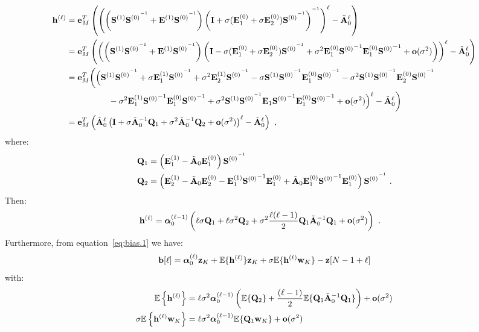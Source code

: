 \begin{align*}
{\mathbf h}^{(\ell)} &= {\mathbf e}_M^T\left( \left( \left({\mathbf S}^{(1)}{{\mathbf S}^{(0)}}^{^{-1}}+{\mathbf E}^{(1)}{{\mathbf S}^{(0)}}^{^{-1}}\right)\left({\mathbf I}+\sigma({\mathbf E}_1^{(0)}+\sigma{\mathbf E}_2^{(0)}){{\mathbf S}^{(0)}}^{^{-1}}\right)^{^{-1}} \right)^\ell- \tilde{{\mathbf A}}_0^\ell\right) \\
& = {\mathbf e}_M^T\left( \left( \left({\mathbf S}^{(1)}{{\mathbf S}^{(0)}}^{^{-1}}+{\mathbf E}^{(1)}{{\mathbf S}^{(0)}}^{^{-1}}\right)\left({\mathbf I}-\sigma({\mathbf E}_1^{(0)}+\sigma{\mathbf E}_2^{(0)}){{\mathbf S}^{(0)}}^{^{-1}} + \sigma^2{\mathbf E}_1^{(0)}{{\mathbf S}^{(0)}}^{-1}{\mathbf E}_1^{(0)}{{\mathbf S}^{(0)}}^{-1} +{\mathbf o}(\sigma^2)\right)\right)^\ell- \tilde{{\mathbf A}}_0^\ell\right) \\
& = {\mathbf e}_M^T\bigg( \Big( {\mathbf S}^{(1)}{{\mathbf S}^{(0)}}^{^{-1}}+\sigma{\mathbf E}^{(1)}_1{{\mathbf S}^{(0)}}^{^{-1}}+\sigma^2{\mathbf E}^{(1)}_2{{\mathbf S}^{(0)}}^{^{-1}} - \sigma {\mathbf S}^{(1)}{{\mathbf S}^{(0)}}^{^{-1}}{\mathbf E}_1^{(0)}{{\mathbf S}^{(0)}}^{^{-1}} - \sigma^2{\mathbf S}^{(1)}{{\mathbf S}^{(0)}}^{^{-1}}{\mathbf E}_2^{(0)}{{\mathbf S}^{(0)}}^{^{-1}}\\
& \hspace{50pt}-\sigma^2{\mathbf E}^{(1)}_1{{\mathbf S}^{(0)}}^{-1}{\mathbf E}_1^{(0)}{{\mathbf S}^{(0)}}^{-1} + \sigma^2{\mathbf S}^{(1)}{{\mathbf S}^{(0)}}^{^{-1}}{\mathbf E}_1{{\mathbf S}^{(0)}}^{-1}{\mathbf E}_1^{(0)}{{\mathbf S}^{(0)}}^{-1} +{\mathbf o}(\sigma^2)\Big)^\ell- \tilde{{\mathbf A}}_0^\ell\bigg) \\
&= {\mathbf e}_M^T\left( \tilde{{\mathbf A}}_0^\ell\left( {\mathbf I}+\sigma\tilde{{\mathbf A}}_0^{-1}{\mathbf Q}_1+\sigma^2\tilde{{\mathbf A}}_0^{-1}{\mathbf Q}_2 +{\mathbf o}(\sigma^2)\right)^\ell- \tilde{{\mathbf A}}_0^\ell\right)\ ,\\
\end{align*}
where:
\begin{align*}
{\mathbf Q}_1 &= \left( {\mathbf E}^{(1)}_1- \tilde{{\mathbf A}}_0{\mathbf E}_1^{(0)} \right){{\mathbf S}^{(0)}}^{^{-1}}\\
{\mathbf Q}_2 &= \left( {\mathbf E}^{(1)}_2 - \tilde{{\mathbf A}}_0{\mathbf E}_2^{(0)} - {\mathbf E}^{(1)}_1{{\mathbf S}^{(0)}}^{-1}{\mathbf E}_1^{(0)} + \tilde{{\mathbf A}}_0{\mathbf E}_1^{(0)}{{\mathbf S}^{(0)}}^{-1}{\mathbf E}_1^{(0)}\right){{\mathbf S}^{(0)}}^{^{-1}} \ .
\end{align*}
Then:
\begin{align*}
{\mathbf h}^{(\ell)} &= \boldsymbol{\alpha}_0^{(\ell-1)}\left(\ell\sigma{\mathbf Q}_1 + \ell\sigma^2{\mathbf Q}_2 + \sigma^2\dfrac{\ell(\ell-1)}{2}{\mathbf Q}_1\tilde{{\mathbf A}}_0^{-1}{\mathbf Q}_1 + {\mathbf o}(\sigma^2)\right)\ .
\end{align*}
Furthermore, from equation~\eqref{eq:bias.1} we have:
\begin{equation*}
{\mathbf b}[\ell] = \boldsymbol{\alpha}_0^{(\ell)}{\mathbf z}_{K} + {\mathbb E}\{{\mathbf h}^{(\ell)}\}{\mathbf z}_{K} + \sigma{\mathbb E}\{{\mathbf h}^{(\ell)}{\mathbf w}_{K}\} - {\mathbf z}[N-1+\ell]
\end{equation*}
with:
\begin{align*}
{\mathbb E}\left\{{\mathbf h}^{(\ell)}\right\} &= \ell\sigma^2\boldsymbol{\alpha}_0^{(\ell-1)}\left({\mathbb E}\{{\mathbf Q}_2\} + \dfrac{(\ell-1)}{2}{\mathbb E}\{{\mathbf Q}_1\tilde{{\mathbf A}}_0^{-1}{\mathbf Q}_1\}\right)  + {\mathbf o}(\sigma^2)\\
\sigma{\mathbb E}\left\{{\mathbf h}^{(\ell)}{\mathbf w}_K\right\} &= \ell\sigma^2\boldsymbol{\alpha}_0^{(\ell-1)}{\mathbb E}\{{\mathbf Q}_1{\mathbf w}_K\} + {\mathbf o}(\sigma^2)
\end{align*}
